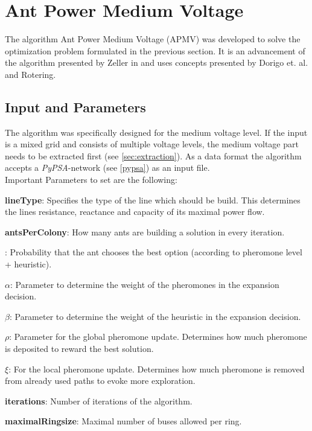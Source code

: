 

\section{Ant Power Medium Voltage}\label{sec:antpowermv}
The algorithm Ant Power Medium Voltage (APMV) was developed to solve the optimization problem formulated in the previous section. It is an advancement of the algorithm presented by Zeller in \cite{zeller2021planung} and uses concepts presented by Dorigo et. al. and Rotering.


\subsection{Input and Parameters}\label{parameters}
The algorithm was specifically designed for the medium voltage level. If the input is a mixed grid and consists of multiple voltage levels, the medium voltage part needs to be extracted first (see \ref{sec:extraction}). As a data format the algorithm accepts a \textit{PyPSA}-network (see \ref{pypsa}) as an input file.\\
Important Parameters to set are the following:
\begin{itemize}
	\setlength\itemsep{-0.8em}
	\item \textbf{lineType}: Specifies the type of the line which should be build. This determines the lines resistance, reactance and capacity of its maximal power flow.
	\item \textbf{antsPerColony}: How many ants are building a solution in every iteration.
	\item {: Probability that the ant chooses the best option (according to pheromone level + heuristic).
	\item \textbf{$\alpha$}: Parameter to determine the weight of the pheromones in the expansion decision.
	\item \textbf{$\beta$}: Parameter to determine the weight of the heuristic in the expansion decision.
	\item \textbf{$\rho$}: Parameter for the global pheromone update. Determines how much pheromone is deposited to reward the best solution.
	\item \textbf{$\xi$}: For the local pheromone update. Determines how much pheromone is removed from already used paths to evoke more exploration.}
	\item \textbf{iterations}: Number of iterations of the algorithm.
	\item \textbf{maximalRingsize}: Maximal number of buses allowed per ring.
\end{itemize}


